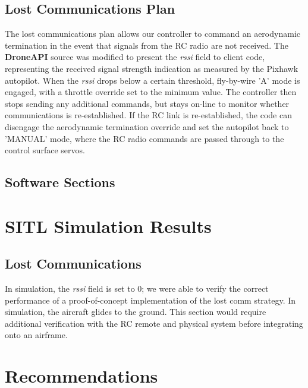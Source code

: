 \documentclass{aiaa}
\begin{document}
\subsection{Lost Communications Plan}
The lost communications plan allows our controller to command an aerodynamic termination in the event that signals from the RC radio are not received. The \textbf{DroneAPI} source was modified to present the \textit{rssi} field to client code, representing the received signal strength indication as measured by the Pixhawk autopilot. When the \textit{rssi} drops below a certain threshold, fly-by-wire 'A' mode is engaged, with a throttle override set to the minimum value. The controller then stops sending any additional commands, but stays on-line to monitor whether communications is re-established. If the RC link is re-established, the code can disengage the aerodynamic termination override and set the autopilot back to 'MANUAL' mode, where the RC radio commands are passed through to the control surface servos.
\subsection{Software Sections}
\section{SITL Simulation Results}
\subsection{Lost Communications}
In simulation, the \textit{rssi} field is set to 0; we were able to verify the correct performance of a proof-of-concept implementation of the lost comm strategy. In simulation, the aircraft glides to the ground. This section would require additional verification with the RC remote and physical system before integrating onto an airframe.
\section{Recommendations}
\end{document}
